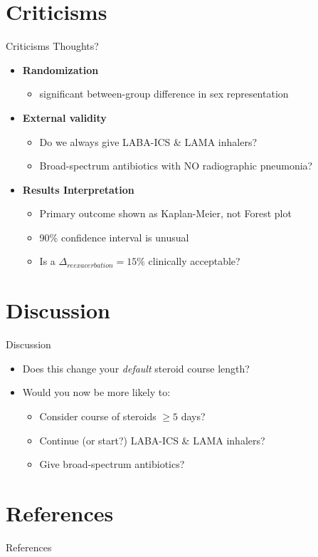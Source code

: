 \documentclass{beamer}
\newcommand{\triple}{LABA-ICS \& LAMA }
\begin{document}
\section{Criticisms}
	\begin{frame}{Criticisms}
		Thoughts?
		\pause
		\begin{itemize}
			\item \textbf{Randomization}
			\begin{itemize}
				\item significant between-group difference in sex representation
			\end{itemize}
			\item \textbf{External validity}
			\begin{itemize}
				\item Do we always give \triple inhalers?
				\item Broad-spectrum antibiotics with NO radiographic pneumonia?
			\end{itemize}
			\item \textbf{Results Interpretation}
			\begin{itemize}
				\item Primary outcome shown as Kaplan-Meier, not Forest plot
				\item 90\% confidence interval is unusual
				\item Is a $\Delta_{reexacerbation} = 15\%$ clinically acceptable?
			\end{itemize}
		\end{itemize}
	\end{frame}
\section{Discussion}
	\begin{frame}{Discussion}
		\begin{itemize}
			\item Does this change your \textit{default} steroid course length?
			\item Would you now be more likely to:
				\begin{itemize}
					\item Consider course of steroids $\geq 5$ days?
					\item Continue (or start?) \triple inhalers?
					\item Give broad-spectrum antibiotics?
				\end{itemize} 
		\end{itemize}
	\end{frame}
\section*{References}
	\begin{frame}[allowframebreaks]{References}
		\printbibliography
	\end{frame}
\end{document}
